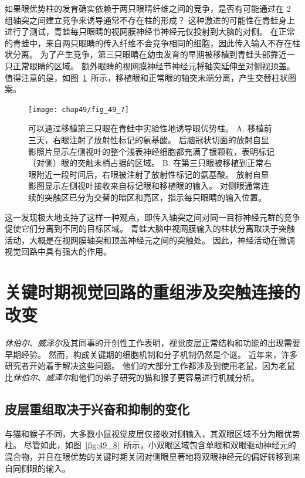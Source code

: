 如果眼优势柱的发育确实依赖于两只眼睛纤维之间的竞争，是否有可能通过在 2 组轴突之间建立竞争来诱导通常不存在柱的形成？
这种激进的可能性在青蛙身上进行了测试，青蛙每只眼睛的视网膜神经节神经元仅投射到大脑的对侧。
在正常的青蛙中，来自两只眼睛的传入纤维不会竞争相同的细胞，因此传入输入不存在柱状分离。
为了产生竞争，第三只眼睛在幼虫发育的早期被移植到青蛙头部靠近一只正常眼睛的区域。
额外眼睛的视网膜神经节神经元将轴突延伸至对侧视顶盖。
值得注意的是，如图~\ref{fig:49_7}~所示，移植眼和正常眼的轴突末端分离，产生交替柱状图案。


\begin{figure}[htbp]
	\centering
	\texttt{[image: chap49/fig\_49\_7]}
	\caption{可以通过移植第三只眼在青蛙中实验性地诱导眼优势柱\cite{constantine1978eye}。
		A. 移植前三天，右眼注射了放射性标记的氨基酸。
		后脑冠状切面的放射自显影照片显示左侧视叶的整个浅表神经细胞都充满了银颗粒，表明标记（对侧）眼的突触末梢占据的区域。
		B. 在第三只眼被移植到正常右眼附近一段时间后，右眼被注射了放射性标记的氨基酸。
		放射自显影图显示左侧视叶接收来自标记眼和移植眼的输入。
		对侧眼通常连续的突触区已分为交替的暗区和亮区，指示每只眼睛的输入位置。}
	\label{fig:49_7}
\end{figure}


这一发现极大地支持了这样一种观点，即传入轴突之间对同一目标神经元群的竞争促使它们分离到不同的目标区域。
青蛙大脑中视网膜输入的柱状分离取决于突触活动，大概是在视网膜轴突和顶盖神经元之间的突触处。
因此，神经活动在微调视觉回路中具有强大的作用。



\section{关键时期视觉回路的重组涉及突触连接的改变}

\textit{休伯尔}、\textit{威泽尔}及其同事的开创性工作表明，视觉皮层正常结构和功能的出现需要早期经验。
然而，构成关键期的细胞机制和分子机制仍然是个谜。
近年来，许多研究者开始着手解决这些问题。
他们的大部分工作都涉及到使用老鼠，因为老鼠比\textit{休伯尔}、\textit{威泽尔}和他们的弟子研究的猫和猴子更容易进行机械分析。


\subsection{皮层重组取决于兴奋和抑制的变化}

与猫和猴子不同，大多数小鼠视觉皮层仅接收对侧输入，其双眼区域不分为眼优势柱。
尽管如此，如图~\ref{fig:49_8}~所示，小双眼区域包含单眼和双眼驱动神经元的混合物，并且在眼优势的关键时期关闭对侧眼显著地将双眼神经元的偏好转移到来自同侧眼的输入。


